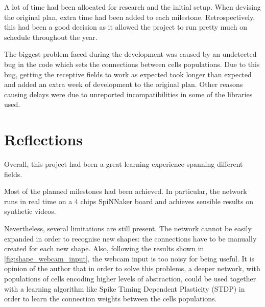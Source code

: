 A lot of time had been allocated for research and the initial setup. When devising the original plan, extra time had been added to each milestone. Retrospectively, this had been a good decision as it allowed the project to run pretty much on schedule throughout the year.

The biggest problem faced during the development was caused by an undetected bug in the code which sets the connections between cells populations. Due to this bug, getting the receptive fields to work as expected took longer than expected and added an extra week of development to the original plan. Other reasons causing delays were due to unreported incompatibilities in some of the libraries used.

\section{Reflections}
Overall, this project had been a great learning experience spanning different fields. 

Most of the planned milestones had been achieved. In particular, the network runs in real time on a 4 chips SpiNNaker board and achieves sensible results on synthetic videos.

Nevertheless, several limitations are still present. The network cannot be easily expanded in order to recognise new shapes: the connections have to be manually created for each new shape. Also, following the results shown in \cref{fig:shape_webcam_input}, the webcam input is too noisy for being useful. It is opinion of the author that in order to solve this problems, a deeper network, with populations of cells encoding higher levels of abstraction, could be used together with a learning algorithm like Spike Timing Dependent Plasticity (STDP) \cite{Song2000} in order to learn the connection weights between the cells populations. 